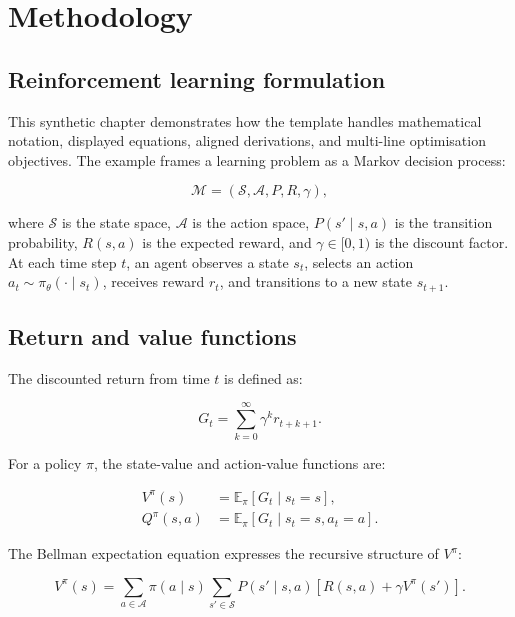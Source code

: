 
\chapter{Methodology}

\section{Reinforcement learning formulation}

This synthetic chapter demonstrates how the template handles mathematical notation, displayed equations, aligned derivations, and multi-line optimisation objectives. The example frames a learning problem as a Markov decision process:

\begin{equation}
\mathcal{M} = \left(\mathcal{S}, \mathcal{A}, P, R, \gamma\right),
\label{eq:mdp}
\end{equation}

where $\mathcal{S}$ is the state space, $\mathcal{A}$ is the action space, $P(s' \mid s,a)$ is the transition probability, $R(s,a)$ is the expected reward, and $\gamma \in [0,1)$ is the discount factor. At each time step $t$, an agent observes a state $s_t$, selects an action $a_t \sim \pi_\theta(\cdot \mid s_t)$, receives reward $r_t$, and transitions to a new state $s_{t+1}$.

\section{Return and value functions}

The discounted return from time $t$ is defined as:

\begin{equation}
G_t = \sum_{k=0}^{\infty} \gamma^k r_{t+k+1}.
\label{eq:return}
\end{equation}

For a policy $\pi$, the state-value and action-value functions are:

\begin{align}
V^\pi(s) &= \mathbb{E}_\pi \left[ G_t \mid s_t = s \right], \label{eq:value}\\
Q^\pi(s,a) &= \mathbb{E}_\pi \left[ G_t \mid s_t = s, a_t = a \right]. \label{eq:qvalue}
\end{align}

The Bellman expectation equation expresses the recursive structure of $V^\pi$:

\begin{equation}
V^\pi(s) =
\sum_{a \in \mathcal{A}} \pi(a \mid s)
\sum_{s' \in \mathcal{S}} P(s' \mid s,a)
\left[R(s,a) + \gamma V^\pi(s')\right].
\label{eq:bellman-expectation}
\end{equation}

